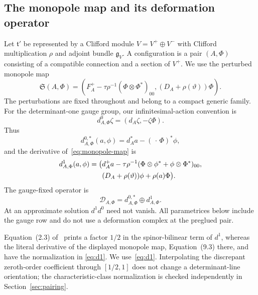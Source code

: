 \documentclass[11pt]{amsart}
\theoremstyle{definition}
\theoremstyle{remark}
\theoremstyle{plain}
\begin{document}
\subsection{The monopole map and its deformation operator}
Let $\mathfrak t'$ be represented by a Clifford module
$V=V^+\oplus V^-$ with Clifford multiplication $\rho$ and adjoint bundle
$\mathfrak g_V$.  A configuration is a pair $(A,\Phi)$ consisting of a
compatible connection and a section of $V^+$.  We use the perturbed monopole
map
\begin{equation}\label{eq:monopole-map}
 \mathfrak S(A,\Phi)=
 \left(
 F_A^+-\tau\rho^{-1}(\Phi\otimes\Phi^*)_{00},
 (D_A+\rho(\vartheta))\Phi
 \right).
\end{equation}
The perturbations are fixed throughout and belong to a compact generic
family.  For the determinant-one gauge group, our infinitesimal-action
convention is
\[
 d^0_{A,\Phi}\zeta=(d_A\zeta,-\zeta\Phi).
\]
Thus
\[
 d^{0,*}_{A,\Phi}(a,\phi)=d_A^*a-(\,\cdot\,\Phi)^*\phi,
\]
and the derivative of~\eqref{eq:monopole-map} is
\begin{align}\label{eq:d1}
d^1_{A,\Phi}(a,\phi)=\bigl(&d_A^+a-
\tau\rho^{-1}(\Phi\otimes\phi^*+\phi\otimes\Phi^*)_{00},\notag\\
&(D_A+\rho(\vartheta))\phi+\rho(a)\Phi\bigr).
\end{align}
The gauge-fixed operator is
\begin{equation}\label{eq:gauge-fixed}
 \mathscr D_{A,\Phi}=d^{0,*}_{A,\Phi}\oplus d^1_{A,\Phi}.
\end{equation}
At an approximate solution $d^1d^0$ need not vanish.  All parametrices below
include the gauge row and do not use a deformation complex at the preglued
pair.

Equation~(2.3) of~\cite{FeehanLenessIII} prints a factor $1/2$ in the
spinor-bilinear term of $d^1$, whereas the literal derivative of the displayed
monopole map, Equation~(9.3) there, and
\cite[Equation~(2.36)]{FeehanLenessI} have the normalization in
\eqref{eq:d1}.  We use~\eqref{eq:d1}.  Interpolating the discrepant
zeroth-order coefficient through $[1/2,1]$ does not change a determinant-line
orientation; the characteristic-class normalization is checked independently
in Section~\ref{sec:pairing}.
\end{document}
